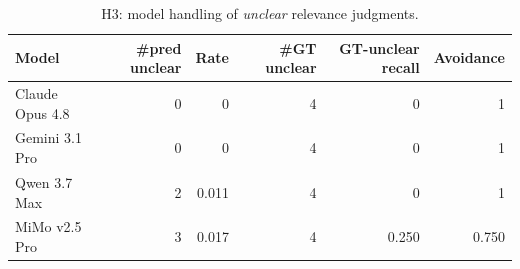 \begin{table}[htbp]
  \centering
  \caption{H3: model handling of \emph{unclear} relevance judgments.}
  \label{tab:relevance-h3}
  \begin{tabular}{lrrrrr}
    \toprule
    Model & \#pred unclear & Rate & \#GT unclear & GT-unclear recall & Avoidance \\
    \midrule
    Claude Opus 4.8 & 0 & 0 & 4 & 0 & 1 \\
    Gemini 3.1 Pro & 0 & 0 & 4 & 0 & 1 \\
    Qwen 3.7 Max & 2 & 0.011 & 4 & 0 & 1 \\
    MiMo v2.5 Pro & 3 & 0.017 & 4 & 0.250 & 0.750 \\
    \bottomrule
  \end{tabular}
\end{table}
